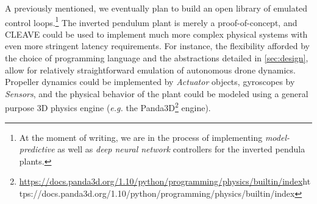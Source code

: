 A previously mentioned, we eventually plan to build an open library of emulated control loops.\footnote{%
    At the moment of writing, we are in the process of implementing \emph{model-predictive} as well as \emph{deep neural network} controllers for the inverted pendula plants.%
}
The inverted pendulum plant is merely a proof-of-concept, and \gls{CLEAVE} could be used to implement much more complex physical systems with even more stringent latency requirements.
For instance, the flexibility afforded by the choice of programming language and the abstractions detailed in \cref{sec:design}, allow for relatively straightforward emulation of autonomous drone dynamics.
Propeller dynamics could be implemented by \emph{Actuator} objects, gyroscopes by \emph{Sensors}, and the physical behavior of the plant could be modeled using a general purpose 3D physics engine (\emph{e.g.} the Panda3D\footnote{\url{https://docs.panda3d.org/1.10/python/programming/physics/builtin/index}{https://docs.panda3d.org/1.10/python/programming/physics/builtin/index}} engine).

